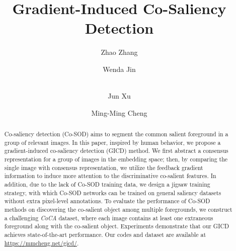 \documentclass[runningheads,orivec]{llncs}
\begin{document}
\pagestyle{headings}
\mainmatter
\def\ECCVSubNumber{1615}  

\title{Gradient-Induced Co-Saliency Detection} 










\author{
 Zhao Zhang  
 \and Wenda Jin  
 \and \\ Jun Xu  
 \and Ming-Ming Cheng  
}



\maketitle

\begin{abstract}
Co-saliency detection (Co-SOD) aims to segment the common salient foreground in a group of relevant images.
In this paper, inspired by human behavior, we propose a gradient-induced co-saliency detection (GICD) method.
We first abstract a consensus representation for a group of images in the embedding space; 
then,  
by comparing the single image with consensus representation,
we utilize the feedback gradient information to induce more attention to the discriminative co-salient features.
In addition, due to the lack of Co-SOD training data, 
we design a jigsaw training strategy, 
with which Co-SOD networks can be trained on general saliency datasets without extra pixel-level annotations.
To evaluate the performance of Co-SOD methods on discovering the co-salient object among multiple foregrounds,
we construct a challenging \textit{CoCA} dataset,
where each image contains at least one extraneous foreground along with the co-salient object.
Experiments demonstrate that our GICD achieves state-of-the-art performance.
Our codes and dataset are available at \url{https://mmcheng.net/gicd/}.
\end{abstract}
\end{document}
